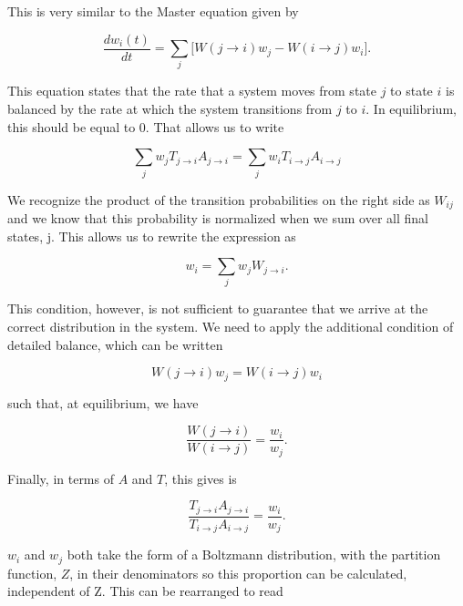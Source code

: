 \documentclass[%
oneside,                 %
final,                   %
10pt]{article}
\begin{document}
This is very similar to the Master equation given by

\begin{equation*}
\frac{dw_i(t)}{dt}=\sum_j \lbrack W(j \rightarrow i) w_j - W(i \rightarrow j) w_i \rbrack.
\end{equation*}

This equation states that the rate that a system moves from state $j$ to state $i$ is balanced by the rate at which the system transitions from $j$ to $i$.  In equilibrium, this should be equal to 0.  That allows us to write

\begin{equation*}
\sum_j w_j T_{j \rightarrow i}A_{j \rightarrow i} = \sum_j w_i T_{i \rightarrow j}A_{i \rightarrow j}
\end{equation*}

We recognize the product of the transition probabilities on the right side as $W_{ij}$ and we know that this probability is normalized when we sum over all final states, j.  This allows us to rewrite the expression as

\begin{equation*}
w_i=\sum_j w_j W_{j \rightarrow i}.
\end{equation*}

This condition, however, is not sufficient to guarantee that we arrive at the correct distribution in the system.  We need to apply the additional condition of detailed balance, which can be written

\begin{equation*}
W(j \rightarrow i)w_j = W(i \rightarrow j) w_i
\end{equation*}

such that, at equilibrium, we have

\begin{equation*}
\frac{W(j \rightarrow i)}{W(i \rightarrow j)}=\frac{w_i}{w_j}.
\end{equation*}

Finally, in terms of $A$ and $T$, this gives is

\begin{equation*}
\frac{T_{j \rightarrow i}A_{j \rightarrow i}}{T_{i \rightarrow j}A_{i \rightarrow j}}=\frac{w_i}{w_j}.
\end{equation*}

$w_i$ and $w_j$ both take the form of a Boltzmann distribution, with the partition function, $Z$, in their denominators so this proportion can be calculated, independent of Z. This can be rearranged to read
\end{document}
